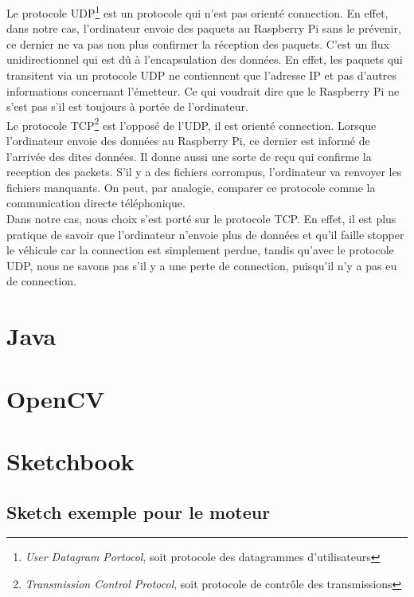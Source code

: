 \documentclass[a4paper,12pt]{report}
\begin{document}
{Le protocole UDP\footnote{\textit{User Datagram Portocol}, soit protocole des datagrammes d'utilisateurs} est un protocole qui n'est pas orienté connection. En effet, dans notre cas, l'ordinateur envoie des paquets au Raspberry Pi sans le prévenir, ce dernier ne va pas non plus confirmer la réception des paquets. C'est un flux unidirectionnel qui est dû à l'encapsulation des données. En effet, les paquets qui transitent via un protocole UDP ne contiennent que l'adresse IP et pas d'autres informations concernant l'émetteur. Ce qui voudrait dire que le Raspberry Pi ne s'est pas s'il est toujours à portée de l'ordinateur. \\
Le protocole TCP\footnote{\textit{Transmission Control Protocol}, soit protocole de contrôle des transmissions} est l'opposé de l'UDP, il est orienté connection. Lorsque l'ordinateur envoie des données au Raspberry Pi, ce dernier est informé de l'arrivée des dites données. Il donne aussi une sorte de reçu qui confirme la reception des packets. S'il y a des fichiers corrompus, l'ordinateur va renvoyer les fichiers manquants. On peut, par analogie, comparer ce protocole comme la communication directe téléphonique.\\
Dans notre cas, nous choix s'est porté sur le protocole TCP. En effet, il est plus pratique de savoir que l'ordinateur n'envoie plus de données et qu'il faille stopper le véhicule car la connection est simplement perdue, tandis qu'avec le protocole UDP, nous ne savons pas s'il y a une perte de connection, puisqu'il n'y a pas eu de connection.  


\section{Java}


\section{OpenCV}




\clearpage

\appendix

\section{Sketchbook}

\subsection{Sketch exemple pour le moteur}


}
\end{document}
